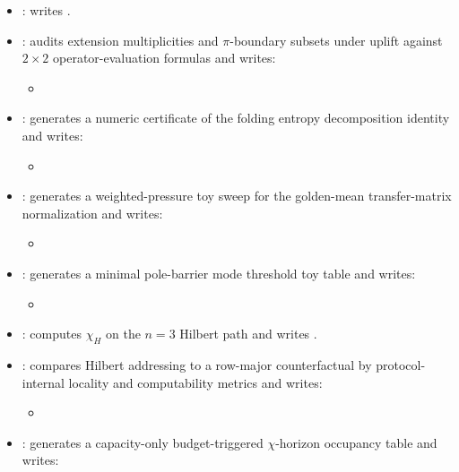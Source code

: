 \begin{sloppypar}
\begin{itemize}
\item {}: writes .
\item {}: audits extension multiplicities and $\pi$-boundary subsets under uplift against $2\times2$ operator-evaluation formulas and writes:
\begin{itemize}
\item {}
\end{itemize}
\item {}: generates a numeric certificate of the folding entropy decomposition identity and writes:
\begin{itemize}
\item {}
\end{itemize}
\item {}: generates a weighted-pressure toy sweep for the golden-mean transfer-matrix normalization and writes:
\begin{itemize}
\item {}
\end{itemize}
\item {}: generates a minimal pole-barrier mode threshold toy table and writes:
\begin{itemize}
\item {}
\end{itemize}
\item {}: computes $\chi_H$ on the $n=3$ Hilbert path and writes .
\item {}: compares Hilbert addressing to a row-major counterfactual by protocol-internal locality and computability metrics and writes:
\begin{itemize}
\item {}
\end{itemize}
\item {}: generates a capacity-only budget-triggered $\chi$-horizon occupancy table and writes:

\end{itemize}
\end{sloppypar}
